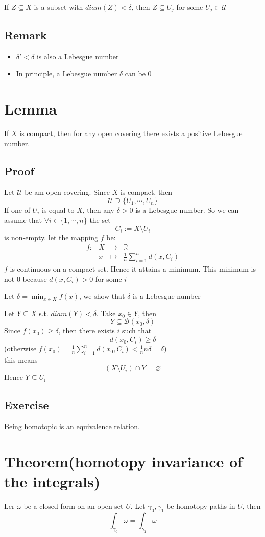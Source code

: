 \documentclass{book}
\begin{document}
If $Z\subseteq X$ is a subset with $diam(Z)<\delta$, then $Z\subseteq U_j$ for some $U_j\in \mathcal{U}$
\subsection*{Remark}\begin{itemize}
    \item $\delta'<\delta$ is also a Lebesgue number
    \item In principle, a Lebesgue number $\delta$ can be 0
\end{itemize}
\section{Lemma} If $X$ is compact, then for any open covering there exists a positive Lebesgue number.
\subsection*{Proof}
Let $\mathcal{U}$ be am open covering. Since $X$ is compact, then $$\mathcal{U}\supseteq\{U_1,\cdots,U_n\}$$
If one of $U_i$ is equal to $X$, then any $\delta>0$ is a Lebesgue number. So we can assume that $\forall i\in \{1,\cdots,n\}$ the set$$C_i:=X\setminus U_i$$
is non-empty. let the mapping $f$ be:
$$\begin{aligned}
    f:&X&\rightarrow&\mathbb{R}\\
    &x&\mapsto&\frac{1}{n}\sum\limits_{i=1}^n d(x,C_i)
\end{aligned}$$
$f$ is continuous on a compact set. Hence it attains a minimum. This minimum is not 0 because $d(x,C_i)>0$ for some $i$

Let $\delta=\min_{x\in X}f(x)$, we show that $\delta $ is a Lebesgue number

Let $Y\subseteq X$ s.t. $diam(Y)<\delta$. Take $x_0\in Y$, then $$Y\subseteq \mathcal{B}(x_0,\delta)$$
Since $f(x_0)\geq\delta$, then there exists $i$ such that$$d(x_0,C_i)\geq\delta$$
(otherwise $f(x_0)=\frac{1}{n}\sum\limits_{i=1}^n d(x_0,C_i)<\frac{1}nn\delta=\delta$)\\this means$$(X\setminus U_i)\cap Y=\varnothing$$
Hence $Y\subseteq U_i$
\subsection*{Exercise}Being homotopic is an equivalence relation.
\section{Theorem(homotopy invariance of the integrals)}
Ler $\omega$ be a closed form on an open set $U$. Let $\gamma_0,\gamma_1$ be homotopy paths in $U$, then $$\int_{\gamma_0}\omega=\int_{\gamma_1}\omega$$
\end{document}
